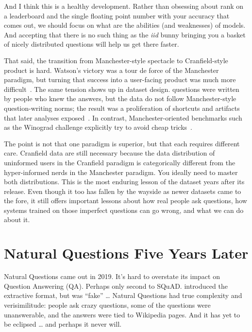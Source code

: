 And I think this is a healthy development.  
%
Rather than obsessing about rank on a leaderboard and the single
floating point number with your accuracy that comes out, we should
focus on what are the abilities (and weaknesses) of models.
%
And accepting that there is no such thing as the \textit{iid} bunny
bringing you a basket of nicely distributed questions will help us get
there faster.

That said, the transition from Manchester-style spectacle to Cranfield-style
product is hard.  Watson's \jeopardy{} victory was a tour de
force of the Manchester paradigm, but turning that success into a
user-facing product was much more difficult~\citep{chu2002piquant,
deutscher-21,jennings2011ibm}. The same tension shows up in dataset
design. \squad{} questions were written by people who knew the
answers, but the data do not follow Manchester-style question-writing
norms; the result was a proliferation of shortcuts and artifacts that
later analyses exposed~\citep{weissenborn-17}. In contrast,
Manchester-oriented benchmarks such as the Winograd challenge
explicitly try to avoid cheap tricks~\citep{levesque2014behavior}. 

The point is not that one paradigm is superior, but that each requires
different care.
%
Cranfield data are still necessary because the data distribution of
uninformed users in the Cranfield paradigm is categorically different
from the hyper-informed nerds in the Manchester paradigm.
%
You ideally need to master both distributions.
%
This is the most enduring lesson of the  dataset years after
its release.  Even though it too has fallen by the wayside as newer
datasets came to the fore, it still offers important lessons about how
real people ask questions, how systems trained on those imperfect
questions can go wrong, and what we can do about it.


\section{Natural Questions Five Years Later}
\label{sec:nq:problems}

Natural Questions came out in 2019.  It’s hard to overstate its impact on Question Answering (QA).  Perhaps only second to SQuAD.  
%
\squad{} introduced the extractive format, but \squad{} was “fake” … Natural Questions had true complexity and verisimilitude: people ask crazy questions, some of the questions were unanswerable, and the answers were tied to Wikipedia pages. 
%
And it has yet to be eclipsed … and perhaps it never will.  

